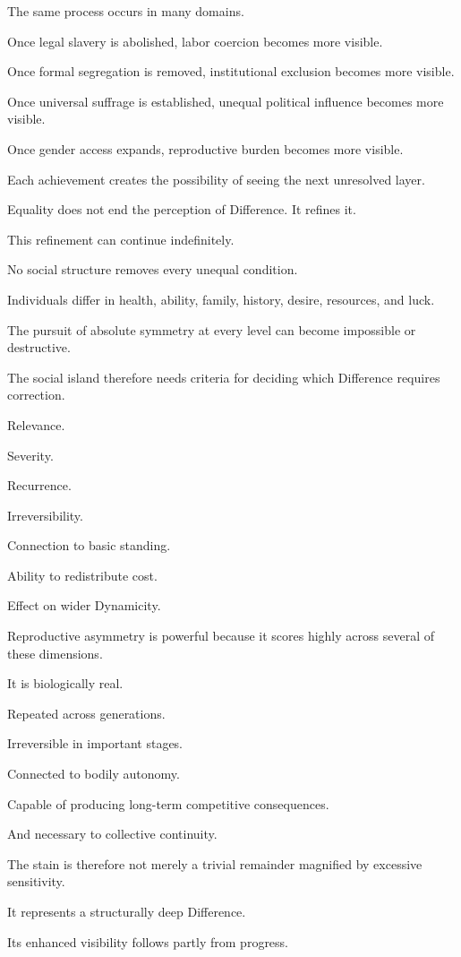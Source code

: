 The same process occurs in many domains.

Once legal slavery is abolished, labor coercion becomes more visible.

Once formal segregation is removed, institutional exclusion becomes more visible.

Once universal suffrage is established, unequal political influence becomes more visible.

Once gender access expands, reproductive burden becomes more visible.

Each achievement creates the possibility of seeing the next unresolved layer.

Equality does not end the perception of Difference. It refines it.

This refinement can continue indefinitely.

No social structure removes every unequal condition.

Individuals differ in health, ability, family, history, desire, resources, and luck.

The pursuit of absolute symmetry at every level can become impossible or destructive.

The social island therefore needs criteria for deciding which Difference requires correction.

Relevance.

Severity.

Recurrence.

Irreversibility.

Connection to basic standing.

Ability to redistribute cost.

Effect on wider Dynamicity.

Reproductive asymmetry is powerful because it scores highly across several of these dimensions.

It is biologically real.

Repeated across generations.

Irreversible in important stages.

Connected to bodily autonomy.

Capable of producing long-term competitive consequences.

And necessary to collective continuity.

The stain is therefore not merely a trivial remainder magnified by excessive sensitivity.

It represents a structurally deep Difference.

Its enhanced visibility follows partly from progress.

